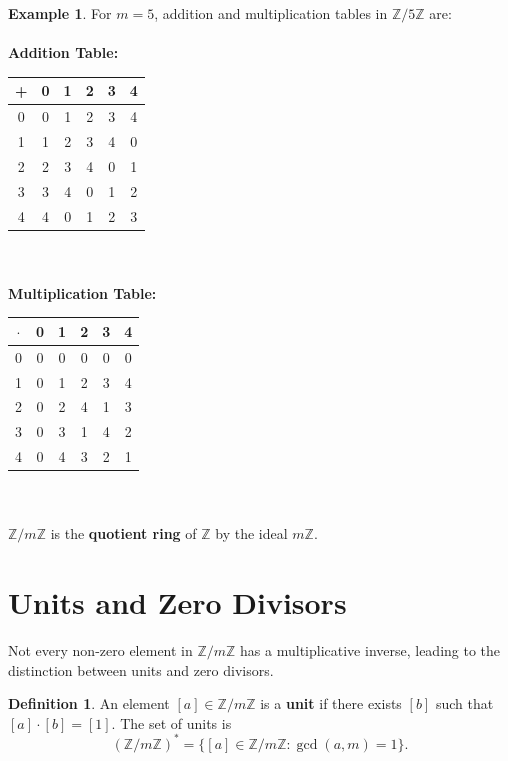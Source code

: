 \documentclass[12pt,openany]{book}
\theoremstyle{definition}
\newtheorem{definition}{Definition}[chapter]
\newtheorem{example}{Example}[chapter]
\theoremstyle{plain}
\theoremstyle{remark}
\begin{document}
\begin{example}
  For $m=5$, addition and multiplication tables in $\mathbb{Z}/5\mathbb{Z}$ are:
  \noindent
  \\ \\
  \textbf{Addition Table:}
  \begin{center}
    \begin{tabular}{c|ccccc}
      + & 0 & 1 & 2 & 3 & 4 \\ \hline
      0 & 0 & 1 & 2 & 3 & 4 \\
      1 & 1 & 2 & 3 & 4 & 0 \\
      2 & 2 & 3 & 4 & 0 & 1 \\
      3 & 3 & 4 & 0 & 1 & 2 \\
      4 & 4 & 0 & 1 & 2 & 3 \\
    \end{tabular}
  \end{center}
  \noindent
  \\ \\
  \textbf{Multiplication Table:}
  \begin{center}
    \begin{tabular}{c|ccccc}
      $\cdot$ & 0 & 1 & 2 & 3 & 4 \\ \hline
      0 & 0 & 0 & 0 & 0 & 0 \\
      1 & 0 & 1 & 2 & 3 & 4 \\
      2 & 0 & 2 & 4 & 1 & 3 \\
      3 & 0 & 3 & 1 & 4 & 2 \\
      4 & 0 & 4 & 3 & 2 & 1 \\
    \end{tabular}
  \end{center}
\end{example}
\noindent
\\ \\
$\mathbb{Z}/m\mathbb{Z}$ is the \textbf{quotient ring} of $\mathbb{Z}$ by the ideal $m\mathbb{Z}$.

\section{Units and Zero Divisors}

Not every non-zero element in $\mathbb{Z}/m\mathbb{Z}$ has a multiplicative inverse, leading to the distinction between units and zero divisors.

\begin{definition}
  An element $[a] \in \mathbb{Z}/m\mathbb{Z}$ is a \textbf{unit} if there exists $[b]$ such that $[a] \cdot [b] = [1]$. The set of units is
  \[
  (\mathbb{Z}/m\mathbb{Z})^* = \{ [a] \in \mathbb{Z}/m\mathbb{Z} : \gcd(a, m) = 1 \}.
  \]
\end{definition}
\end{document}
